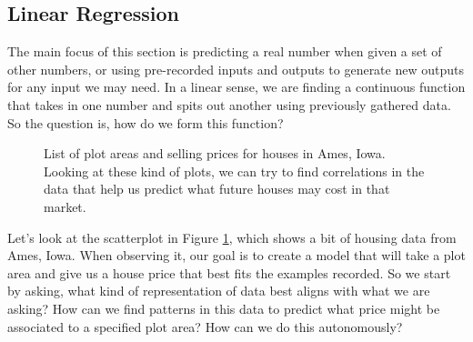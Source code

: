 \subsection{Linear Regression}



The main focus of this section is predicting a real number when given a set of
other numbers, or using pre-recorded inputs and outputs to generate new outputs
for any input we may need. In a linear sense, we are finding a continuous
function that takes in one number and spits out another using previously
gathered data. So the question is, how do we form this function?


\begin{figure}[t!]
\centering
    \caption{List of plot areas and selling prices for houses in Ames, Iowa.
    Looking at these kind of plots, we can try to find correlations in the data
    that help us predict what future houses may cost in that market.}
    \label{fig:hp}
\end{figure}

Let's look at the scatterplot in Figure \ref{fig:hp}, which shows a bit of
housing data from Ames, Iowa. When observing it, our goal is to create a model
that will take a plot area and give us a house price that best fits the examples
recorded. So we start by asking, what kind of representation of data best aligns
with what we are asking? How can we find patterns in this data to predict what
price might be associated to a specified plot area? How can we do this
autonomously?

